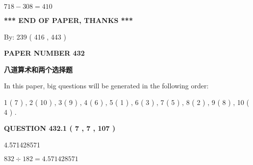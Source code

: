 \documentclass{ctexart}
\begin{document}
 
\noindent{}

$ %
718 -  %
308=   %
410$
 
 
   
   
 \vspace{0.2in}
 
   
   
   
   
\vspace{1.0in} 
{\textbf{\large{ *** END OF PAPER, THANKS *** }}} 
   
   
\hspace{1.0in} By: 
 239 ( 416 ,  443 )
   
   
   
   
\newpage 
\setcounter{page}{ 
   432001 } 
   
   
   
   
 {\textbf{ \Large{ PAPER NUMBER  432  }}}
   
   
\vspace{0.2in}
   
   
   
   
   
   
 \vspace{0.2in}
{\LARGE {\textbf{ 八道算术和两个选择题}}}
   
   
   
\vspace{0.2in}
   
In this paper, big questions will be generated in the following order: 
   
   
   1 ( 7 )
 ,
   2 ( 10 )
 ,
   3 ( 9 )
 ,
   4 ( 6 )
 ,
   5 ( 1 )
 ,
   6 ( 3 )
 ,
   7 ( 5 )
 ,
   8 ( 2 )
 ,
   9 ( 8 )
 ,
   10 ( 4 )
 .
  
\vspace{0.2in}
  
{\textbf{\Large{QUESTION
432.1 
 ( 7 , 7 , 107 )
}}}
  
  
 
 
\noindent{}

4.571428571
 
 
 
 
\noindent{}

$ %
832 \div  %
182=   %
4.571428571$
 
\end{document}
